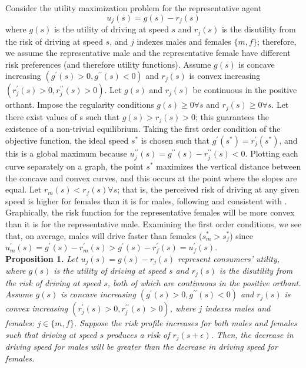 \documentclass{cje}
\begin{document}
Consider the utility maximization problem 
for the representative agent
%
$$
	u_j (s) = g(s) - r_j (s)
$$
% 
where $g(s)$ is the utility of driving at speed $s$ 
and $r_j (s)$ is the disutility from the risk of driving at speed $s$, 
and $j$ indexes males and females $\{m,f\}$;
% 
therefore, we assume the representative male and the representative female 
have different risk preferences (and therefore utility functions). 
% 
Assume $g(s)$ is concave increasing $(g^{\prime} (s)>0, 
g^{\prime\prime} (s)<0)$ 
and $r_j (s)$ is convex increasing $(r_j^{\prime} (s)>0, r_j^{\prime\prime} (s)>0)$. 
Let $g(s)$ and $r_j (s)$ be continuous in the positive orthant. 
Impose the regularity conditions $g(s)\geq0 \forall s$ and $r_j (s)\geq0 \forall s$. 
Let there exist values of s such that $g(s)>r_j (s)>0$; 
this guarantees the existence of a non-trivial equilibrium. 
Taking the first order condition of the objective function, 
the ideal speed $s^*$ is chosen such that $g^{\prime} (s^*)=r_j^{\prime} (s^*)$, 
and this is a global maximum because 
$u_j^{\prime\prime} (s)=g^{\prime\prime} (s)-r_j^{\prime\prime} (s)<0$. 
Plotting each curve separately on a graph, 
the point $s^*$ maximizes the vertical distance between the concave and convex curves,
% 
and this occurs at the point where the slopes are equal. 
Let $r_m (s)<r_f (s)  \forall s$; 
that is, the perceived risk of driving at any given speed 
is higher for females than it is for males, 
following 
\citet{harris2006}
and consistent with
\citet{crosongneezy2009}.
Graphically, the risk function for the representative females will be more convex than it is for the representative male. 
Examining the first order conditions, 
we see that, on average, males will drive faster than females ($s_m^*>s_f^*$) 
since 
$u_m^{\prime} (s)
=g^{\prime} (s)-r_m^{\prime} (s)
>g^{\prime} (s)-r_f^{\prime} (s)
=u_f^{\prime} (s)$. \\


\textbf{Proposition 1.} {\it 
Let $u_j (s) = g(s) - r_j (s)$ represent consumers' utility, 
where $g(s)$ is the utility of driving at speed $s$ 
and $r_j (s)$ is the disutility from the risk of driving at speed $s$, 
both of which are continuous in the positive orthant. 
%
Assume $g(s)$ is concave increasing $(g^{\prime} (s)>0, 
g^{\prime\prime} (s)<0)$ 
and $r_j (s)$ is convex increasing $(r_j^{\prime} (s)>0, r_j^{\prime\prime} (s)>0)$, 
where $j$ indexes males and females: $j \in \{m,f\}$. 
%
Suppose the risk profile increases 
for both males and females such that driving at speed $s$ 
produces a risk of $r_j (s+\epsilon)$. 
%
Then, the decrease in driving speed for males will be greater 
than the decrease in driving speed for females.} \\
\end{document}

